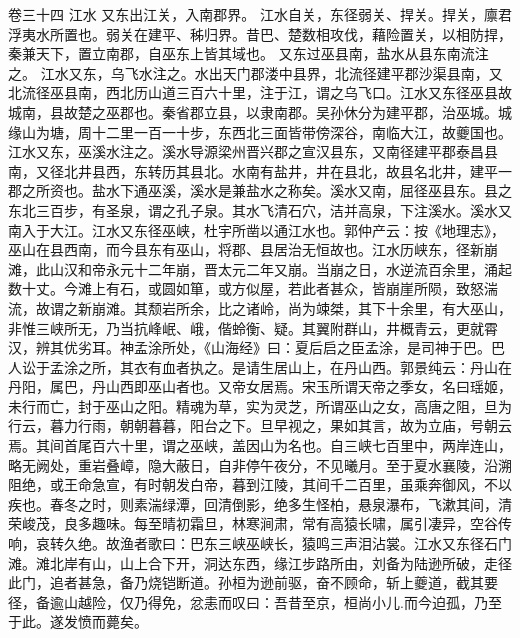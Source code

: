 \documentclass[12pt,UTF8]{ctexbook}
\begin{document}
卷三十四  江水 
又东出江关，入南郡界。
江水自关，东径弱关、捍关。捍关，廪君浮夷水所置也。弱关在建平、秭归界。昔巴、楚数相攻伐，藉险置关，以相防捍，秦兼天下，置立南郡，自巫东上皆其域也。
又东过巫县南，盐水从县东南流注之。
江水又东，乌飞水注之。水出天门郡溇中县界，北流径建平郡沙渠县南，又北流径巫县南，西北历山道三百六十里，注于江，谓之乌飞口。江水又东径巫县故城南，县故楚之巫郡也。秦省郡立县，以隶南郡。吴孙休分为建平郡，治巫城。城缘山为塘，周十二里一百一十步，东西北三面皆带傍深谷，南临大江，故夔国也。江水又东，巫溪水注之。溪水导源梁州晋兴郡之宣汉县东，又南径建平郡泰昌县南，又径北井县西，东转历其县北。水南有盐井，井在县北，故县名北井，建平一郡之所资也。盐水下通巫溪，溪水是兼盐水之称矣。溪水又南，屈径巫县东。县之东北三百步，有圣泉，谓之孔子泉。其水飞清石穴，洁并高泉，下注溪水。溪水又南入于大江。江水又东径巫峡，杜宇所凿以通江水也。郭仲产云：按《地理志》，巫山在县西南，而今县东有巫山，将郡、县居治无恒故也。江水历峡东，径新崩滩，此山汉和帝永元十二年崩，晋太元二年又崩。当崩之日，水逆流百余里，涌起数十丈。今滩上有石，或圆如箪，或方似屋，若此者甚众，皆崩崖所陨，致怒湍流，故谓之新崩滩。其颓岩所余，比之诸岭，尚为竦桀，其下十余里，有大巫山，非惟三峡所无，乃当抗峰岷、峨，偕蛉衡、疑。其翼附群山，井概青云，更就霄汉，辨其优劣耳。神孟涂所处，《山海经》曰：夏后启之臣孟涂，是司神于巴。巴人讼于孟涂之所，其衣有血者执之。是请生居山上，在丹山西。郭景纯云：丹山在丹阳，属巴，丹山西即巫山者也。又帝女居焉。宋玉所谓天帝之季女，名曰瑶姬，未行而亡，封于巫山之阳。精魂为草，实为灵芝，所谓巫山之女，高唐之阻，旦为行云，暮力行雨，朝朝暮暮，阳台之下。旦早视之，果如其言，故为立庙，号朝云焉。其间首尾百六十里，谓之巫峡，盖因山为名也。自三峡七百里中，两岸连山，略无阙处，重岩叠嶂，隐大蔽日，自非停午夜分，不见曦月。至于夏水襄陵，沿溯阻绝，或王命急宣，有时朝发白帝，暮到江陵，其间千二百里，虽乘奔御风，不以疾也。春冬之时，则素湍绿潭，回清倒影，绝多生怪柏，悬泉瀑布，飞漱其间，清荣峻茂，良多趣味。每至晴初霜旦，林寒涧肃，常有高猿长啸，属引凄异，空谷传响，哀转久绝。故渔者歌曰：巴东三峡巫峡长，猿鸣三声泪沾裳。江水又东径石门滩。滩北岸有山，山上合下开，洞达东西，缘江步路所由，刘备为陆逊所破，走径此门，追者甚急，备乃烧铠断道。孙桓为逊前驱，奋不顾命，斩上夔道，截其要径，备逾山越险，仅乃得免，忿恚而叹曰：吾昔至京，桓尚小儿.而今迫孤，乃至于此。遂发愤而薨矣。
\end{document}
